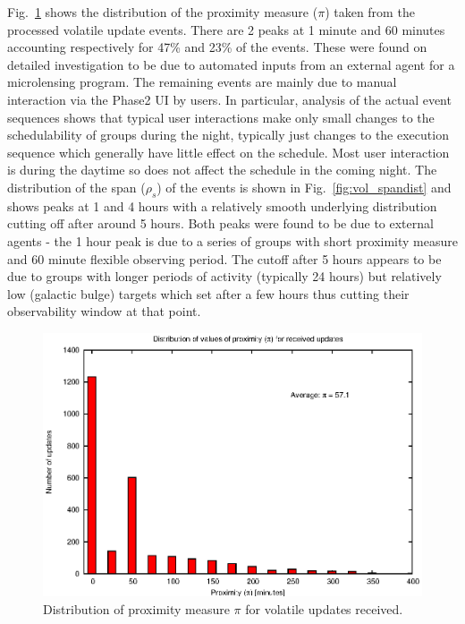 
Fig.~\ref{fig:vol_pidist} shows the distribution of the proximity measure ($\pi$) taken from the processed volatile update events. There are 2 peaks at 1 minute and 60 minutes accounting respectively for 47\% and 23\% of the events. These were found on detailed investigation to be due to automated inputs from an external agent for a microlensing program. The remaining events are mainly due to manual interaction via the Phase2 UI by users. In particular, analysis of the actual event sequences shows that typical user interactions make only small changes to the schedulability of groups during the night, typically just changes to the execution sequence which generally have little effect on the schedule. Most user interaction is during the daytime so does not affect the schedule in the coming night. The distribution of the span ($\rho_s$) of the events is shown in Fig.~\ref{fig:vol_spandist} and shows peaks at 1 and 4 hours with a relatively smooth underlying distribution cutting off after around 5 hours. Both peaks were found to be due to external agents - the 1 hour peak is due to a series of groups with short proximity measure and 60 minute flexible observing  period. The cutoff after 5 hours appears to be due to groups with longer periods of activity (typically 24 hours) but relatively low (galactic bulge) targets which set after a few hours thus cutting their observability window at that point.


\begin{figure}[htbp]
\begin{center}
    \includegraphics[scale=1.0, angle=0]{figures/vol_pi.eps}
\caption[Distribution of proximity measure $\pi$ for volatile updates received.]
{Distribution of proximity measure $\pi$ for volatile updates received.}
\label{fig:vol_pidist}
\end{center}
\end{figure}

